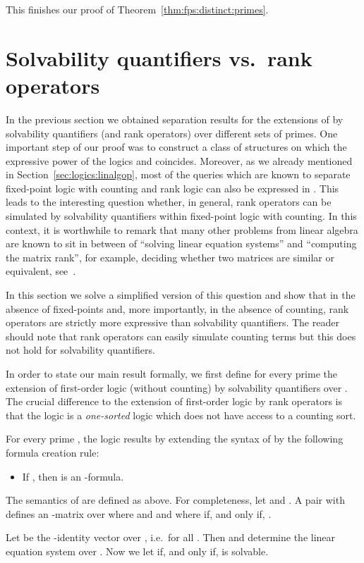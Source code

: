 \documentclass[a4paper,UKenglish]{lipics}
\theoremstyle{plain}
\begin{document}
This finishes our proof of Theorem~\ref{thm:fps:distinct:primes}.



\section{Solvability quantifiers vs.\ rank operators}
\label{sec:slv:rk}

In the previous section we obtained separation results for the 
extensions of  by solvability quantifiers (and rank operators) over 
different sets of primes.
One important step of our proof was to construct a class of structures on which 
the expressive power of the logics  and  
coincides. 
Moreover, as we already mentioned in Section~\ref{sec:logics:linalgop}, most of 
the queries which are known to separate fixed-point logic with counting and 
rank logic can also be expressed in . 
This leads to the interesting question whether, in general, rank operators can 
be simulated by solvability quantifiers within fixed-point logic with counting.
In this context, it is worthwhile to remark that many other problems from 
linear algebra are known to sit in between of ``solving linear equation 
systems'' and ``computing the matrix rank'', for example, deciding whether two 
matrices are similar or equivalent, see~\cite{Pa10, Ho10, La11}.

\smallskip
In this section we solve a simplified version of this question and show that 
in the absence of fixed-points and, more importantly, in the 
absence of counting, rank operators are strictly more expressive than 
solvability quantifiers. The reader should note that rank 
operators can easily simulate counting terms but this does not hold 
for solvability quantifiers.

In order to state our main result formally, we first define for every
prime  the extension  of first-order logic (without counting) by 
solvability quantifiers over . 
The crucial difference to the extension  of first-order logic by rank 
operators  is that the logic  is a \emph{one-sorted} logic which 
does not have access to a counting sort.

\begin{definition}\label{def:fosp}
For every prime , the logic  results by extending the syntax of 
 by the following
formula creation rule:
\begin{itemize}
 \item If , then
    is an 
-formula.
\end{itemize}
\noindent
The semantics of  are defined as above. 
For completeness, let  and . A pair  with  defines an -matrix 
 over  where  and  and where
 if, and only if, .

Let  be the -identity vector over , i.e.\ 
 for all . Then  and  determine
the linear
equation system  over .
Now we let  if, and only if,  is solvable.
\end{definition}
\end{document}
